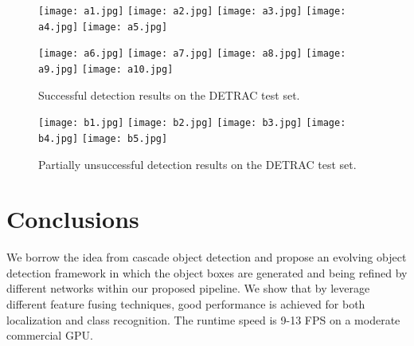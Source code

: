 \documentclass[5pt]{article}
\begin{document}
\begin{figure*}[t]
  \centering
  \texttt{[image: a1.jpg]}
  \texttt{[image: a2.jpg]}
  \texttt{[image: a3.jpg]}
  \texttt{[image: a4.jpg]}
  \texttt{[image: a5.jpg]}

  \texttt{[image: a6.jpg]}
  \texttt{[image: a7.jpg]}
  \texttt{[image: a8.jpg]}
  \texttt{[image: a9.jpg]}
  \texttt{[image: a10.jpg]}
  \caption{Successful detection results on the DETRAC test set. }
  \label{fig:good}
\end{figure*}

\begin{figure*}[t]
  \centering
  \texttt{[image: b1.jpg]}
  \texttt{[image: b2.jpg]}
  \texttt{[image: b3.jpg]}
  \texttt{[image: b4.jpg]}
  \texttt{[image: b5.jpg]}
  \caption{Partially unsuccessful detection results on the DETRAC test set.}
  \label{fig:bad}
\end{figure*}


\section{Conclusions}
  We borrow the idea from cascade object detection and propose an evolving object detection framework in which the object boxes are generated and being refined by different networks within our proposed pipeline. We show that by leverage different feature fusing techniques, good performance is achieved for both localization and class recognition. The runtime speed is 9-13 FPS on a moderate commercial GPU.

\balance


\end{document}
